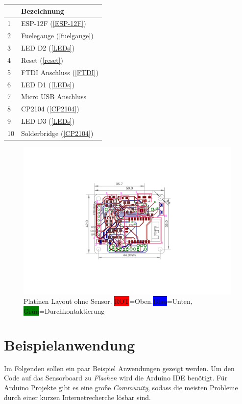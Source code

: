 \documentclass[10pt, a4paper, onecolumn]{article} %
\begin{document}
\begin{table}[h]
	\begin{tabular}{ll}
	
		~  & Bezeichnung\\
		\midrule
		1 & ESP-12F (\ref{ESP-12F})  \\
		2 & Fuelegauge (\ref{fuelgauge}) \\
		3 & LED D2 (\ref{LEDs})  \\
		4 & Reset (\ref{reset})  \\
		5 & FTDI Anschluss (\ref{FTDI}) \\
		6 & LED D1 (\ref{LEDs})  \\
		7 & Micro USB Anschluss  \\
		8 & CP2104 (\ref{CP2104}) \\
		9 & LED D3 (\ref{LEDs})  \\
		10 & Solderbridge (\ref{CP2104})  \\
		\bottomrule
	\end{tabular}
\end{table}

\begin{figure}[h]
	\centering
	\includegraphics[width=0.735\linewidth]{images/BetaICMRev020}
	\caption{Platinen Layout ohne Sensor. \colorbox{red}{ROT}=Oben,\colorbox{blue}{Blau}=Unten, \colorbox{Green}{Grün}=Durchkontaktierung}
	\label{platineBeta}
\end{figure}



\clearpage

\section{Beispielanwendung} \label{Beispiele}
Im Folgenden sollen ein paar Beispiel Anwendungen gezeigt werden. Um den Code auf das Sensorboard zu \emph{Flashen} wird die Arduino IDE benötigt. Für Arduino Projekte gibt es eine große \emph{Community}, sodass die meisten Probleme durch einer kurzen Internetrecherche lösbar sind. 
\end{document}
